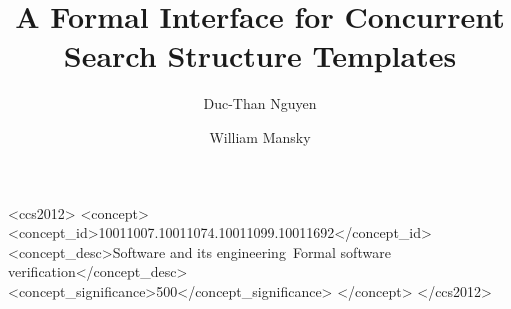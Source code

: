 \documentclass[sigplan,screen]{acmart}
\begin{document}
\title{A Formal Interface for Concurrent Search Structure Templates}

\author{Duc-Than Nguyen}

\author{William Mansky}


\begin{abstract}

\end{abstract}


\begin{CCSXML}
	<ccs2012>
	<concept>
	<concept_id>10011007.10011074.10011099.10011692</concept_id>
	<concept_desc>Software and its engineering~Formal software verification</concept_desc>
	<concept_significance>500</concept_significance>
	</concept>
	</ccs2012>
\end{CCSXML}



\maketitle
\end{document}
